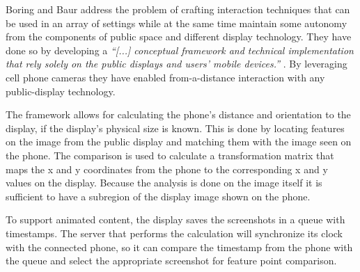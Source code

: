 Boring and Baur address the problem of crafting interaction techniques that can be used in an array of settings while at the same time maintain some autonomy from the components of public space and different display technology. %
They have done so by developing a \emph{``[...] conceptual framework and technical implementation that rely solely on the public displays and users' mobile devices.''} \cite{Boring:2013}. By  leveraging cell phone cameras they have enabled from-a-distance interaction with any public-display technology.
%

The framework allows for calculating the phone's distance and orientation to the display, if the display's physical size is known.
This is done by locating features on the image from the public display and matching them with the image seen on the phone. The comparison is used to calculate a transformation matrix that maps the x and y coordinates from the phone to the corresponding x and y values on the display. Because the analysis is done on the image itself  it is sufficient to have a subregion of the display image shown on the phone.

To support animated content, the display saves the screenshots in a queue with timestamps. The server that performs the calculation will synchronize its clock with the connected phone, so it can compare the timestamp from the phone with the queue and select the appropriate screenshot for feature point comparison.

